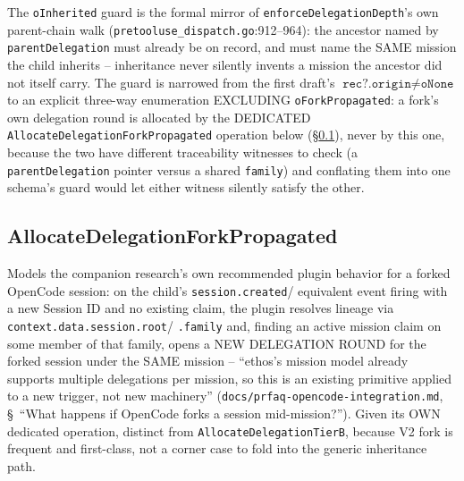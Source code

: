 \documentclass[a4paper,10pt,fleqn]{article}
\newcommand{\fpath}[1]{\texttt{#1}}
\newcommand{\field}[1]{\texttt{#1}}
\begin{document}
The \field{oInherited} guard is the formal mirror of
\field{enforceDelegationDepth}'s own parent-chain walk
(\fpath{pretooluse\_dispatch.go}:912--964): the ancestor named by
\field{parentDelegation} must already be on record, and must name the
SAME mission the child inherits -- inheritance never silently invents a
mission the ancestor did not itself carry. The guard is narrowed from
the first draft's $\field{rec?.origin} \neq \field{oNone}$ to an explicit
three-way enumeration EXCLUDING \field{oForkPropagated}: a fork's own
delegation round is allocated by the DEDICATED
\field{AllocateDelegationForkPropagated} operation below
(\S\ref{sec:opforkpropagate}), never by this one, because the two have
different traceability witnesses to check (a \field{parentDelegation}
pointer versus a shared \field{family}) and conflating them into one
schema's guard would let either witness silently satisfy the other.

\subsection{AllocateDelegationForkPropagated}
\label{sec:opforkpropagate}

Models the companion research's own recommended plugin behavior for a
forked OpenCode session: on the child's \field{session.created}/
equivalent event firing with a new Session ID and no existing claim,
the plugin resolves lineage via \field{context.data.session.root}/
\field{.family} and, finding an active mission claim on some member of
that family, opens a NEW DELEGATION ROUND for the forked session under
the SAME mission -- ``ethos's mission model already supports multiple
delegations per mission, so this is an existing primitive applied to a
new trigger, not new machinery''
(\fpath{docs/prfaq-opencode-integration.md}, \S~``What happens if
OpenCode forks a session mid-mission?''). Given its OWN dedicated
operation, distinct from \field{AllocateDelegationTierB}, because V2
fork is frequent and first-class, not a corner case to fold into the
generic inheritance path.
\end{document}
